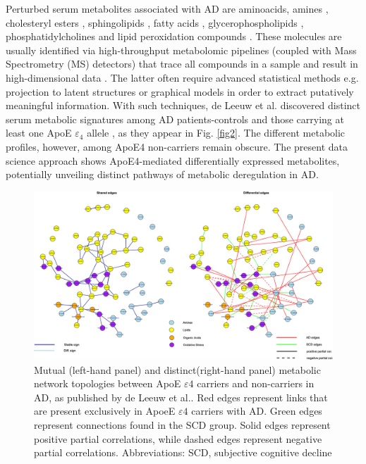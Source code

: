 \documentclass{amsart}
\theoremstyle{plain}
\begin{document}
Perturbed serum metabolites associated with AD are aminoacids, amines \cite{deLeeuw2017Blood-basedDisease, Green2023InvestigatingDisease}, cholesteryl esters \cite{Proitsi2017AssociationAnalysis}, sphingolipids \cite{Varma2018BrainStudy,Sun2022AssociationDisease,Green2023InvestigatingDisease,Oeckl2019GlialImpairment,Barupal2019SetsPathophysiology}, fatty acids \cite{Fernandez-Calle2022APOEDiseases,deLeeuw2017Blood-basedDisease}, glycerophospholipids \cite{Varma2018BrainStudy, Jia2022ATypes,Huo2020BrainAnalysis, Weng2019TheImpairment}, phosphatidylcholines \cite{Simpson2016BloodAging} and lipid peroxidation compounds \cite{Fernandez-Calle2022APOEDiseases}. These molecules are usually identified via high-throughput metabolomic pipelines (coupled with Mass Spectrometry (MS) detectors) that trace all compounds in a sample and result in high-dimensional data \cite{Oka2023MultiomicsCohort}. The latter often require advanced statistical methods e.g. projection to latent structures \cite{Weng2019TheImpairment, Peeters2019StableData} or graphical models \cite{Peeters2022Rags2ridges:Matrices} in order to extract putatively meaningful information. 
With such techniques, de Leeuw et al. discovered distinct serum metabolic signatures among AD patients-controls and those carrying at least one ApoE $\varepsilon_4$ allele \cite{deLeeuw2017Blood-basedDisease}, as they appear in Fig. \ref{fig2}. The different metabolic profiles, however, among ApoE4 non-carriers remain obscure. The present data science approach shows ApoE4-mediated differentially expressed metabolites, potentially unveiling distinct pathways of metabolic deregulation in AD.

\begin{figure}
\vspace*{-1cm}
  \includegraphics[width=\textwidth]{figures/network.jpeg}
    \caption{Mutual (left-hand panel) and distinct(right-hand panel) metabolic network topologies between ApoE $\varepsilon4$ carriers and non-carriers in AD, as published by de Leeuw et al.. Red edges represent links that are present exclusively in ApoeE $\varepsilon4$ carriers with AD. Green edges represent connections found in the SCD group. Solid edges represent positive partial correlations, while dashed edges represent negative partial correlations. Abbreviations: SCD, subjective cognitive decline }
  \label{fig3}
\end{figure}
\end{document}
